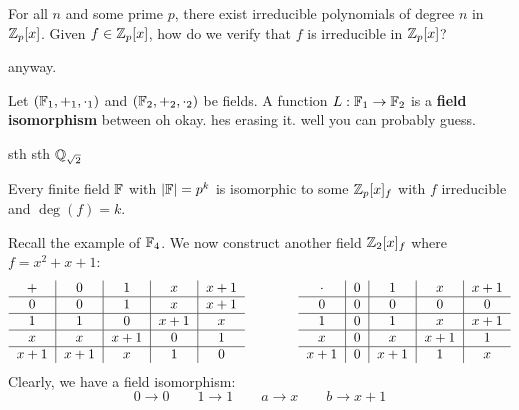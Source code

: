 \documentclass{article}
\begin{document}

For all $ n $ and some prime $ p $, there exist irreducible polynomials of degree $ n $ in
$ \mathbb{Z}_{p}[x] $. Given $ f \in \mathbb{Z}_{p}[x] $, how do we verify that $ f $ is irreducible
in $ \mathbb{Z}_{p}[x] $?

anyway.

\begin{defn}
    Let $ (\mathbb{F}_{1}, +_{1}, \cdot_{1}) $ and $ (\mathbb{F}_{2}, +_{2}, \cdot_{2}) $ be fields. \vsp
    A function $ L: \mathbb{F}_{1} \rightarrow \mathbb{F}_{2} $ is a \textbf{field isomorphism} between
    oh okay. hes erasing it. well you can probably guess.
\end{defn}

\begin{xmp}[source=Primary Source Material]
    sth sth $ \mathbb{Q}_{\sqrt{2}} $
\end{xmp}

\begin{thm}
    Every finite field $ \mathbb{F} $ with $ \abs{\mathbb{F}} = p^{k} $ is isomorphic to some
    $ \mathbb{Z}_{p}[x]_{f} $ with $ f $ irreducible and $ \deg(f) = k $.
\end{thm}

\begin{xmp}[source=Primary Source Material]
    Recall the example of $ \mathbb{F}_{4} $.
    We now construct another field $ \mathbb{Z}_{2}[x]_{f} $ where $ f = x^{2} + x + 1 $:
    \begin{equation*}
        \begin{tabular}{c|c|c|c|c}
            $ + $     & $ 0 $     & $ 1 $     & $ x $     & $ x + 1 $ \\ \hline
            $ 0 $     & $ 0 $     & $ 1 $     & $ x $     & $ x + 1 $ \\ \hline
            $ 1 $     & $ 1 $     & $ 0 $     & $ x + 1 $ & $ x $     \\ \hline
            $ x $     & $ x $     & $ x + 1 $ & $ 0 $     & $ 1 $     \\ \hline
            $ x + 1 $ & $ x + 1 $ & $ x $     & $ 1 $     & $ 0 $
        \end{tabular} \qquad \qquad
        \begin{tabular}{c|c|c|c|c}
            $ \cdot $     & $ 0 $ & $ 1 $     & $ x $     & $ x + 1 $ \\ \hline
                $ 0 $     & $ 0 $ & $ 0 $     & $ 0 $     & $ 0 $     \\ \hline
                $ 1 $     & $ 0 $ & $ 1 $     & $ x $     & $ x + 1 $ \\ \hline
                $ x $     & $ 0 $ & $ x $     & $ x + 1 $ & $ 1 $     \\ \hline
                $ x + 1 $ & $ 0 $ & $ x + 1 $ & $ 1 $     & $ x $
        \end{tabular}
    \end{equation*}
    Clearly, we have a field isomorphism:
    \begin{equation*}
        0 \rightarrow 0 \qquad 1 \rightarrow 1 \qquad a \rightarrow x \qquad b \rightarrow x + 1
    \end{equation*}
\end{xmp}
\end{document}

